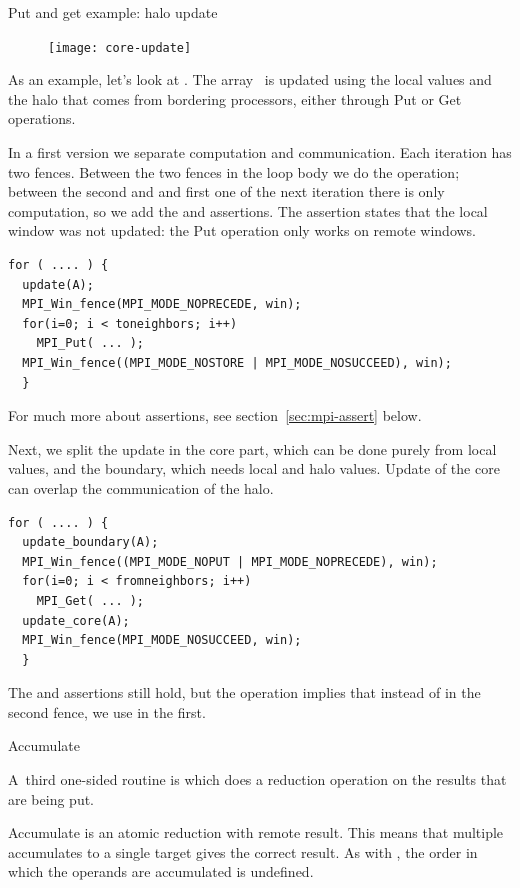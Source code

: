  {Put and get example: halo update}

\begin{figure}
  \texttt{[image: core-update]}
\end{figure}
%
As an example, let's look at .
The array~ is updated using the local values and the halo
that comes from bordering processors, either through Put or Get operations.

In a first version we separate computation and communication.
Each iteration has two fences. Between the two fences in the loop body
we do the  operation; between the second and and first one
of the next iteration there is only computation, so we add the
 and  assertions. 
The  assertion
states that the local window was not updated: the Put operation only
works on remote windows.
\begin{lstlisting}
for ( .... ) {
  update(A); 
  MPI_Win_fence(MPI_MODE_NOPRECEDE, win); 
  for(i=0; i < toneighbors; i++) 
    MPI_Put( ... );
  MPI_Win_fence((MPI_MODE_NOSTORE | MPI_MODE_NOSUCCEED), win); 
  }
\end{lstlisting}
For much more about
assertions, see section~\ref{sec:mpi-assert} below.

Next, we split the update in the core part, which can be done purely
from local values, and the boundary, which needs local and halo
values. Update of the core can overlap the communication of the halo.
\begin{lstlisting}
for ( .... ) {
  update_boundary(A); 
  MPI_Win_fence((MPI_MODE_NOPUT | MPI_MODE_NOPRECEDE), win); 
  for(i=0; i < fromneighbors; i++) 
    MPI_Get( ... );
  update_core(A); 
  MPI_Win_fence(MPI_MODE_NOSUCCEED, win); 
  }
\end{lstlisting}
The  and  assertions still hold, but the
 operation implies that instead of  in the
second fence, we use  in the first.

 {Accumulate}

A~third one-sided routine
is  which does a reduction operation on the results
that are being put.

Accumulate is an atomic reduction with remote result.
This means that multiple accumulates to a single target
gives the correct result.
As with , the 
order in which the operands are accumulated is undefined.

